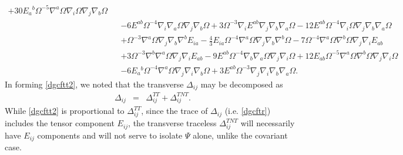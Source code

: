 \documentclass[10pt,letterpaper]{article}
\numberwithin{equation}{section}
\begin{document}
\begin{eqnarray}
+ 30 E_{a}{}^{b} \Omega^{-5} \nabla^{a}\Omega \nabla_{i}\Omega \nabla_{j}\nabla_{b}\Omega\nonumber\\
&& - 6 E^{ab} \Omega^{-4} \nabla_{i}\nabla_{a}\Omega \nabla_{j}\nabla_{b}\Omega
+ 3 \Omega^{-3} \nabla_{i}E^{ab} \nabla_{j}\nabla_{b}\nabla_{a}\Omega
- 12 E^{ab} \Omega^{-4} \nabla_{i}\Omega \nabla_{j}\nabla_{b}\nabla_{a}\Omega\nonumber\\
&& + \Omega^{-3} \nabla^{a}\Omega \nabla_{j}\nabla_{b}\nabla^{b}E_{ia}
-  \tfrac{4}{3} E_{ia} \Omega^{-4} \nabla^{a}\Omega \nabla_{j}\nabla_{b}\nabla^{b}\Omega
- 7 \Omega^{-4} \nabla^{a}\Omega \nabla^{b}\Omega \nabla_{j}\nabla_{i}E_{ab}\nonumber\\
&& + 3 \Omega^{-3} \nabla^{b}\nabla^{a}\Omega \nabla_{j}\nabla_{i}E_{ab}
- 9 E^{ab} \Omega^{-4} \nabla_{b}\nabla_{a}\Omega \nabla_{j}\nabla_{i}\Omega
+ 12 E_{ab} \Omega^{-5} \nabla^{a}\Omega \nabla^{b}\Omega \nabla_{j}\nabla_{i}\Omega\nonumber\\
&& - 6 E_{a}{}^{b} \Omega^{-4} \nabla^{a}\Omega \nabla_{j}\nabla_{i}\nabla_{b}\Omega
+ 3 E^{ab} \Omega^{-3} \nabla_{j}\nabla_{i}\nabla_{b}\nabla_{a}\Omega.
\label{dgcftt2}
\end{eqnarray}
In forming \eqref{dgcftt2}, we noted that the transverse $\Delta_{ij}$ may be decomposed as
\begin{eqnarray}
\Delta_{ij} &=& \Delta_{ij}^{TT} + \Delta_{ij}^{TNT}.
\end{eqnarray}
While \eqref{dgcftt2} is proportional to $\Delta_{ij}^{TT}$, since the trace of $\Delta_{ij}$ (i.e. \eqref{dgcftr}) includes the tensor component $E_{ij}$, the transverse traceless $\Delta_{ij}^{TNT}$ will necessarily have $E_{ij}$ components and will not serve to isolate $\Psi$ alone, unlike the covariant case.
\end{document}

